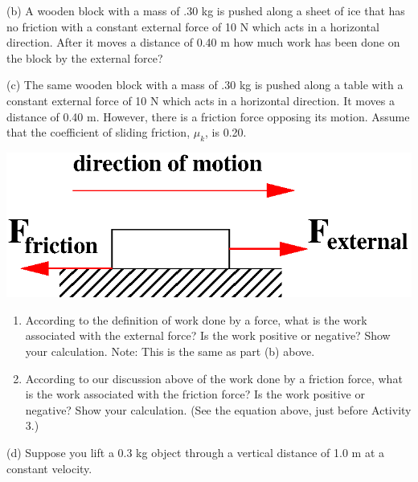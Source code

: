 (b) A wooden block with a mass of .30 kg is pushed along a sheet of ice that
has no friction with a constant external force of 10 N which acts in a 
horizontal direction. After it moves a distance of 0.40 m how much work has 
been done on the block by the external force?
\answerspace{20mm}

(c) The same wooden block with a mass of .30 kg is pushed along a table with
a constant external force of 10 N which acts in a horizontal direction. It moves
a distance of 0.40 m. However, there is a friction force opposing its motion.
Assume that the coefficient of sliding friction, \( \mu _{k} \), is 0.20. 

\vspace{0.3cm}
{\par\centering \includegraphics{work_power/work_power_fig4b.eps} \par}
\vspace{0.3cm}

\begin{enumerate}
\item According to the definition of work done by a force, what is the work associated with the external force? Is the work positive or negative? Show your calculation. Note: This is the same as part (b) above.
\answerspace{20mm}

\item According to our discussion above of the work done by a friction force, what is the work associated with the friction force? Is the work positive or negative? Show your calculation. (See the equation above, just before Activity 3.)
\answerspace{20mm}

\end{enumerate}
(d) Suppose you lift a 0.3 kg object through a vertical distance of 1.0 m at a constant velocity.

